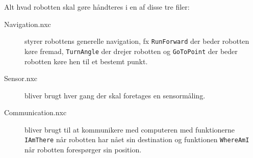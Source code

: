 Alt hvad robotten skal gøre håndteres i en af disse tre filer:

\begin{description}
\item[Navigation.nxc]{styrer robottens generelle navigation, fx \lstinline[style=c]!RunForward! der beder robotten køre fremad, \lstinline[style=c]!TurnAngle! der drejer robotten og \lstinline[style=c]!GoToPoint! der beder robotten køre hen til et bestemt punkt.}
\item[Sensor.nxc]{bliver brugt hver gang der skal foretages en sensormåling.}
\item[Communication.nxc]{bliver brugt til at kommunikere med computeren med funktionerne \lstinline[style=c]!IAmThere! når robotten har nået sin destination og funktionen \lstinline[style=c]!WhereAmI! når robotten forespørger sin position.}
\end{description}
